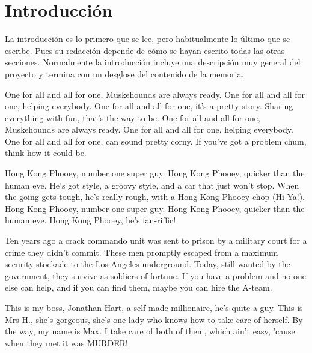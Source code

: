 %
%

\chapter[Introducción]{
	Introducción
}

La introducción es lo primero que se lee, pero habitualmente lo último que se escribe.
Pues su redacción depende de cómo se hayan escrito todas las otras secciones. Normalmente la introducción incluye una descripción muy general del proyecto y termina con un desglose del contenido de la memoria.

One for all and all for one, Muskehounds are always ready. One for all and all for one, helping everybody. One for all and all for one, it's a pretty story. Sharing everything with fun, that's the way to be. One for all and all for one, Muskehounds are always ready. One for all and all for one, helping everybody. One for all and all for one, can sound pretty corny. If you've got a problem chum, think how it could be.

Hong Kong Phooey, number one super guy. Hong Kong Phooey, quicker than the human eye. He's got style, a groovy style, and a car that just won't stop. When the going gets tough, he's really rough, with a Hong Kong Phooey chop (Hi-Ya!). Hong Kong Phooey, number one super guy. Hong Kong Phooey, quicker than the human eye. Hong Kong Phooey, he's fan-riffic!

Ten years ago a crack commando unit was sent to prison by a military court for a crime they didn't commit. These men promptly escaped from a maximum security stockade to the Los Angeles underground. Today, still wanted by the government, they survive as soldiers of fortune. If you have a problem and no one else can help, and if you can find them, maybe you can hire the A-team.

This is my boss, Jonathan Hart, a self-made millionaire, he's quite a guy. This is Mrs H., she's gorgeous, she's one lady who knows how to take care of herself. By the way, my name is Max. I take care of both of them, which ain't easy, 'cause when they met it was MURDER!

